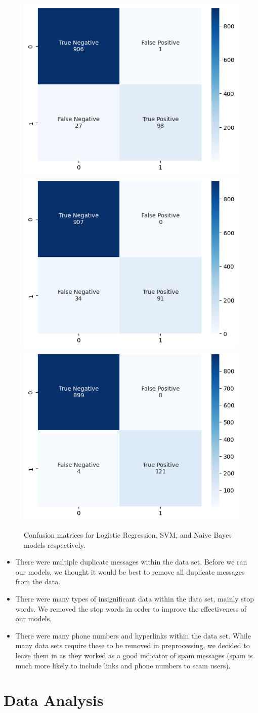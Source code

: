 \documentclass{article}
\begin{document}
\begin{figure}[t]
\vskip 0.2in
\centerline{
    \includegraphics[width=.33\textwidth]{images/linearconfusionmatrix.png}
    \includegraphics[width=.33\textwidth]{images/svmconfusionmatrix.png}
    \includegraphics[width=.33\textwidth]{images/naivebayesconfusionmatrix.png}
}
\caption{Confusion matrices for Logistic Regression, SVM, and Naive Bayes models respectively.}
\vskip 0in
\end{figure}

\begin{itemize}
\item There were multiple duplicate messages within the data set. Before we ran our models, we thought it would be best to remove all duplicate messages from the data.
\item There were many types of insignificant data within the data set, mainly stop words. We removed the stop words in order to improve the effectiveness of our models.
\item There were many phone numbers and hyperlinks within the data set. While many data sets require these to be removed in preprocessing, we decided to leave them in as they worked as a good indicator of spam messages (spam is much more likely to include links and phone numbers to scam users).
\end{itemize}

\section{Data Analysis}
\end{document}
